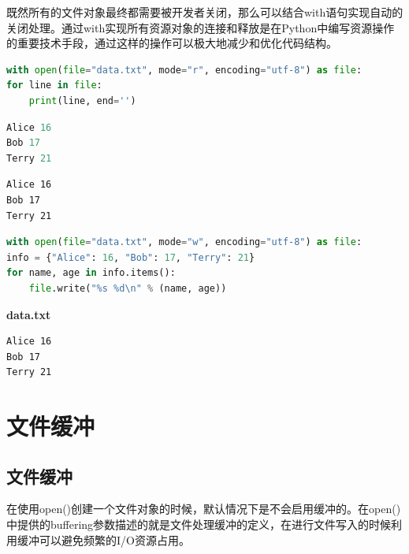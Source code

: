 既然所有的文件对象最终都需要被开发者关闭，那么可以结合with语句实现自动的关闭处理。通过with实现所有资源对象的连接和释放是在Python中编写资源操作的重要技术手段，通过这样的操作可以极大地减少和优化代码结构。\\


\begin{lstlisting}[language=Python]
with open(file="data.txt", mode="r", encoding="utf-8") as file:
for line in file:
	print(line, end='')
\end{lstlisting}

\begin{lstlisting}[language=Python, title=data.txt]
Alice 16
Bob 17
Terry 21
\end{lstlisting}

\begin{tcolorbox}
	\begin{verbatim}
Alice 16
Bob 17
Terry 21
	\end{verbatim}
\end{tcolorbox}

\vspace{0.5cm}


\begin{lstlisting}[language=Python]
with open(file="data.txt", mode="w", encoding="utf-8") as file:
info = {"Alice": 16, "Bob": 17, "Terry": 21}
for name, age in info.items():
	file.write("%s %d\n" % (name, age))
\end{lstlisting}

\begin{tcolorbox}
	\textbf{data.txt}
	\begin{verbatim}
Alice 16
Bob 17
Terry 21
	\end{verbatim}
\end{tcolorbox}

\newpage

\section{文件缓冲}

\subsection{文件缓冲}

在使用open()创建一个文件对象的时候，默认情况下是不会启用缓冲的。在open()中提供的buffering参数描述的就是文件处理缓冲的定义，在进行文件写入的时候利用缓冲可以避免频繁的I/O资源占用。\\

